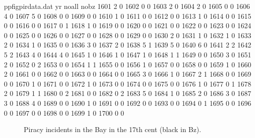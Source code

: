 \begin{filecontents}{ppfigpirdata.dat}
yr	noall	nobz
1601	2	0
1602	0	0
1603	2	0
1604	2	0
1605	0	0
1606	4	0
1607	5	0
1608	0	0
1609	0	0
1610	1	0
1611	0	0
1612	0	0
1613	1	0
1614	0	0
1615	0	0
1616	0	0
1617	0	1
1618	1	0
1619	0	0
1620	0	0
1621	0	0
1622	0	0
1623	0	0
1624	0	0
1625	0	0
1626	0	0
1627	0	0
1628	0	0
1629	0	0
1630	2	0
1631	1	0
1632	1	0
1633	2	0
1634	1	0
1635	0	0
1636	3	0
1637	2	0
1638	5	1
1639	5	0
1640	6	0
1641	2	2
1642	5	2
1643	4	0
1644	4	0
1645	1	0
1646	1	0
1647	1	0
1648	1	1
1649	0	0
1650	3	0
1651	2	0
1652	0	2
1653	0	0
1654	1	1
1655	0	0
1656	1	0
1657	0	0
1658	0	0
1659	1	0
1660	2	0
1661	0	0
1662	0	0
1663	0	0
1664	0	0
1665	3	0
1666	1	0
1667	2	1
1668	0	0
1669	0	0
1670	1	0
1671	0	0
1672	1	0
1673	0	0
1674	0	0
1675	0	0
1676	1	0
1677	0	1
1678	2	0
1679	1	1
1680	0	2
1681	0	0
1682	0	2
1683	5	0
1684	1	0
1685	2	0
1686	3	0
1687	3	0
1688	4	0
1689	0	0
1690	1	0
1691	0	0
1692	0	0
1693	0	0
1694	0	1
1695	0	0
1696	0	0
1697	0	0
1698	0	0
1699	1	0
1700	0	0
\end{filecontents}
\begin{figure}
\begin{sideways}
\end{sideways}
\caption{Piracy incidents in the Bay in the 17th cent (black in Bz).}
\label{fig:piracyinbay}
\end{figure}
%
